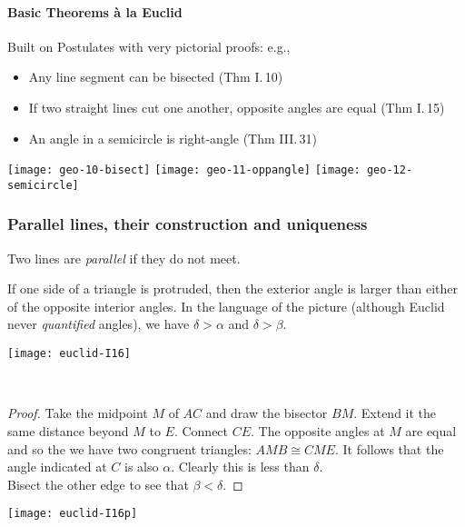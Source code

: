 \graphicspath{{lectures/1axioms/asy/}}

\paragraph{Basic Theorems à la Euclid}

Built on Postulates with very pictorial proofs: e.g.,

\begin{itemize}
  \item Any line segment can be bisected (Thm I.\,10)
  \item If two straight lines cut one another, opposite angles are equal (Thm I.\,15)
  \item An angle in a semicircle is right-angle (Thm III.\,31)
\end{itemize}

\begin{center}
\texttt{[image: geo-10-bisect]}
\qquad
\texttt{[image: geo-11-oppangle]}
\qquad
\texttt{[image: geo-12-semicircle]}
\end{center}


\subsubsection*{Parallel lines, their construction and uniqueness}

\begin{defn*}
Two lines are \emph{parallel} if they do not meet.
\end{defn*}

\noindent\begin{minipage}{0.55\textwidth}
\begin{thm*}[I.\,16]
If one side of a triangle is protruded, then the exterior angle is larger than either of the opposite interior angles. In the language of the picture (although Euclid never \emph{quantified} angles), we have $\delta>\alpha$ and $\delta>\beta$.
\end{thm*}
\end{minipage}\hfill
\begin{minipage}{0.4\textwidth}
\flushright\texttt{[image: euclid-I16]}
\end{minipage}\\[10pt]

\noindent\begin{minipage}{0.55\textwidth}
\begin{proof}
Take the midpoint $M$ of $AC$ and draw the bisector $BM$. Extend it the same distance beyond $M$ to $E$. Connect $CE$. The opposite angles at $M$ are equal and so the we have two congruent triangles: $AMB\cong CME$. It follows that the angle indicated at $C$ is also $\alpha$. Clearly this is less than $\delta$.\\
Bisect the other edge to see that $\beta<\delta$.
\end{proof}
\end{minipage}\hfill
\begin{minipage}{0.4\textwidth}
\flushright\texttt{[image: euclid-I16p]}
\end{minipage}\\[10pt]

